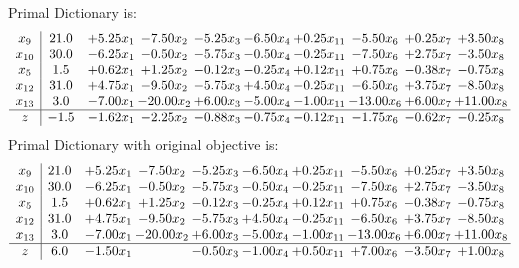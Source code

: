 \documentclass[9pt]{article}
\begin{document}
Primal Dictionary is:
\[\begin{array}{c| c c@{\hskip 2pt} c@{\hskip 2pt} c@{\hskip 2pt} c@{\hskip 2pt} c@{\hskip 2pt} c@{\hskip 2pt} c@{\hskip 2pt} c@{\hskip 2pt} }
 x_{9}   &  21.0 & +  5.25 x_{1} & -7.50 x_{2} & -5.25 x_{3} & -6.50 x_{4} & +  0.25 x_{11} & -5.50 x_{6} & +  0.25 x_{7} & +  3.50 x_{8}\\
 x_{10}   &  30.0 & -6.25 x_{1} & -0.50 x_{2} & -5.75 x_{3} & -0.50 x_{4} & -0.25 x_{11} & -7.50 x_{6} & +  2.75 x_{7} & -3.50 x_{8}\\
 x_{5}   &  1.5 & +  0.62 x_{1} & +  1.25 x_{2} & -0.12 x_{3} & -0.25 x_{4} & +  0.12 x_{11} & +  0.75 x_{6} & -0.38 x_{7} & -0.75 x_{8}\\
 x_{12}   &  31.0 & +  4.75 x_{1} & -9.50 x_{2} & -5.75 x_{3} & +  4.50 x_{4} & -0.25 x_{11} & -6.50 x_{6} & +  3.75 x_{7} & -8.50 x_{8}\\
 x_{13}   &  3.0 & -7.00 x_{1} & -20.00 x_{2} & +  6.00 x_{3} & -5.00 x_{4} & -1.00 x_{11} & -13.00 x_{6} & +  6.00 x_{7} & + 11.00 x_{8}\\
\hline
z    &  -1.5 & -1.62 x_{1} & -2.25 x_{2} & -0.88 x_{3} & -0.75 x_{4} & -0.12 x_{11} & -1.75 x_{6} & -0.62 x_{7} & -0.25 x_{8}\\
\end{array}\]
Primal Dictionary with original objective is:
\[\begin{array}{c| c c@{\hskip 2pt} c@{\hskip 2pt} c@{\hskip 2pt} c@{\hskip 2pt} c@{\hskip 2pt} c@{\hskip 2pt} c@{\hskip 2pt} c@{\hskip 2pt} }
 x_{9}   &  21.0 & +  5.25 x_{1} & -7.50 x_{2} & -5.25 x_{3} & -6.50 x_{4} & +  0.25 x_{11} & -5.50 x_{6} & +  0.25 x_{7} & +  3.50 x_{8}\\
 x_{10}   &  30.0 & -6.25 x_{1} & -0.50 x_{2} & -5.75 x_{3} & -0.50 x_{4} & -0.25 x_{11} & -7.50 x_{6} & +  2.75 x_{7} & -3.50 x_{8}\\
 x_{5}   &  1.5 & +  0.62 x_{1} & +  1.25 x_{2} & -0.12 x_{3} & -0.25 x_{4} & +  0.12 x_{11} & +  0.75 x_{6} & -0.38 x_{7} & -0.75 x_{8}\\
 x_{12}   &  31.0 & +  4.75 x_{1} & -9.50 x_{2} & -5.75 x_{3} & +  4.50 x_{4} & -0.25 x_{11} & -6.50 x_{6} & +  3.75 x_{7} & -8.50 x_{8}\\
 x_{13}   &  3.0 & -7.00 x_{1} & -20.00 x_{2} & +  6.00 x_{3} & -5.00 x_{4} & -1.00 x_{11} & -13.00 x_{6} & +  6.00 x_{7} & + 11.00 x_{8}\\
\hline
z    &  6.0 & -1.50 x_{1} &   & -0.50 x_{3} & -1.00 x_{4} & +  0.50 x_{11} & +  7.00 x_{6} & -3.50 x_{7} & +  1.00 x_{8}\\
\end{array}\]
\end{document}
